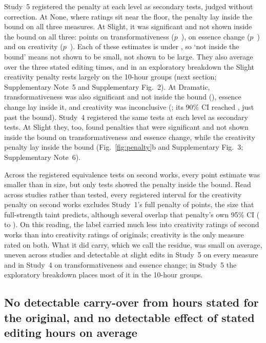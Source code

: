 Study~5 registered the penalty at each level as secondary tests, judged without correction. At None, where ratings sit near the floor, the penalty lay inside the bound on all three measures. At Slight, it was significant and not shown inside the bound on all three: \SFiveTransPenaltySlightEst{} points on transformativeness ($p$~\SFiveTransPenaltySlightP), \SFiveEssPenaltySlightEst{} on essence change ($p$~\SFiveEssPenaltySlightP) and \SFiveCreatPenaltySlightEst{} on creativity ($p$~\SFiveCreatPenaltySlightP). Each of these estimates is under \SourceBound, so `not inside the bound' means not shown to be small, not shown to be large. They also average over the three stated editing times, and in an exploratory breakdown the Slight creativity penalty rests largely on the 10-hour groups (next section; Supplementary Note~5 and Supplementary Fig.~2). At Dramatic, transformativeness was also significant and not inside the bound (\SFiveTransPenaltyDramaticEst), essence change lay inside it, and creativity was inconclusive (\SFiveCreatPenaltyDramaticEst; its 90\% CI reached \SFiveCreatPenaltyDramaticHiNinetyPrecise, just past the bound). Study~4 registered the same tests at each level as secondary tests. At Slight they, too, found penalties that were significant and not shown inside the bound on transformativeness and essence change, while the creativity penalty lay inside the bound (Fig.~\ref{fig:penalty}b and Supplementary Fig.~3; Supplementary Note~6).

Across the \NSourceEquivTests{} registered equivalence tests on second works, every point estimate was smaller than \SourceBound{} in size, but only \NSourceEquivPass{} tests showed the penalty inside the bound. Read across studies rather than tested, every registered interval for the creativity penalty on second works excludes Study~1's full penalty of \SOneHOneCreatDiffPrecise{} points, the size that full-strength taint predicts, although several overlap that penalty's own 95\% CI (\SOneHOneCreatLo{} to \SOneHOneCreatHi). On this reading, the label carried much less into creativity ratings of second works than into creativity ratings of originals; creativity is the only measure rated on both. What it did carry, which we call the residue, was small on average, uneven across studies and detectable at slight edits in Study~5 on every measure and in Study~4 on transformativeness and essence change; in Study~5 the exploratory breakdown places most of it in the 10-hour groups.

\subsection*{No detectable carry-over from hours stated for the original, and no detectable effect of stated editing hours on average}

